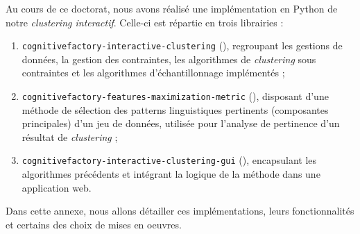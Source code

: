 \label{annex:C-ANNEXE-IMPLEMENTATIONS}

	Au cours de ce doctorat, nous avons réalisé une implémentation en Python de notre \textit{clustering interactif}.
	Celle-ci est répartie en trois librairies :
	\begin{enumerate}
		\item \texttt{cognitivefactory-interactive-clustering} (\cite{schild:2022:cognitivefactory-interactiveclustering}), regroupant les gestions de données, la gestion des contraintes, les algorithmes de \textit{clustering} sous contraintes et les algorithmes d'échantillonnage implémentés ;
		\item \texttt{cognitivefactory-features-maximization-metric} (\cite{schild:2023:cognitivefactory-featuresmaximizationmetric}), disposant d'une méthode de sélection des patterns linguistiques pertinents (composantes principales) d'un jeu de données, utilisée pour l'analyse de pertinence d'un résultat de \textit{clustering} ;
		\item \texttt{cognitivefactory-interactive-clustering-gui} (\cite{schild-etal:2022:cognitivefactory-interactiveclusteringgui}), encapsulant les algorithmes précédents et intégrant la logique de la méthode dans une application web.
	\end{enumerate}
	
	Dans cette annexe, nous allons détailler ces implémentations, leurs fonctionnalités et certains des choix de mises en oeuvres.


	\minitoc
	
	
	
	
	
	
	
	
	
	